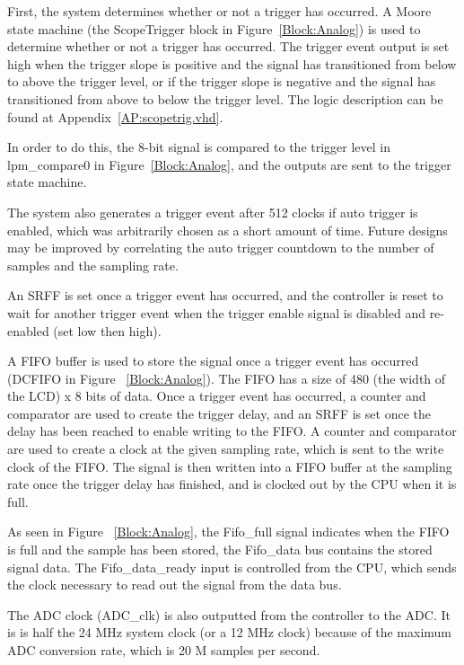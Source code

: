 \documentclass[12pt]{refart} %
\begin{document}
 
First, the system determines whether or not a trigger has occurred.
A Moore state machine (the ScopeTrigger block in Figure~\ref{Block:Analog}) is used to determine whether or not a trigger has occurred. The trigger event output is set high when the trigger slope is positive and the signal has transitioned from below to above the trigger level, or if the trigger slope is negative and the signal has transitioned from above to below the trigger level. The logic description can be found at Appendix~\ref{AP:scopetrig.vhd}.

In order to do this, the 8-bit signal is compared to the trigger level in lpm\_compare0 in Figure~\ref{Block:Analog}, and the outputs are sent to the trigger state machine.

 The system also generates a trigger event after 512 clocks if auto trigger is enabled, which was arbitrarily chosen as a short amount of time. Future designs may be improved by correlating the auto trigger countdown to the number of samples and the sampling rate.

An SRFF is set once a trigger event has occurred, and the controller is reset to wait for another trigger event when the trigger enable signal is disabled and re-enabled (set low then high).  

  A FIFO buffer is used to store the signal once a trigger event has occurred (DCFIFO in Figure ~\ref{Block:Analog}). The FIFO has a size of 480 (the width of the LCD) x 8 bits of data. Once a trigger event has occurred, a counter and comparator are used to create the trigger delay, and an SRFF is set once the delay has been reached to enable writing to the FIFO. A counter and comparator are used to create a clock at the given sampling rate, which is sent to the write clock of the FIFO. The signal is then written into a FIFO buffer at the sampling rate once the trigger delay has finished, and is clocked out by the CPU when it is full. 

 As seen in Figure ~\ref{Block:Analog}, the Fifo\_full signal indicates when the FIFO is full and the sample has been stored, the Fifo\_data bus contains the stored signal data. The Fifo\_data\_ready input is controlled from the CPU, which sends the clock necessary to read out the signal from the data bus.

The ADC clock (ADC\_clk) is also outputted from the controller to the ADC. It is is half the 24 MHz system clock (or a 12 MHz clock) because of the maximum ADC conversion rate, which is 20 M samples per second.
\end{document}
